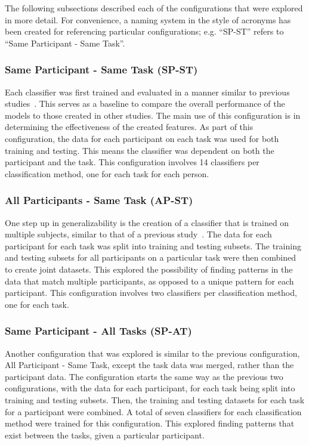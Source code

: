 \documentclass[11pt]{article}
\begin{document}
	The following subsections described each of the configurations that were explored in more detail. For convenience, a naming system in the style of acronyms has been created for referencing particular configurations; e.g. ``SP-ST'' refers to ``Same Participant - Same Task''.
		
		\subsubsection{Same Participant - Same Task (SP-ST)}
		Each classifier was first trained and evaluated in a manner similar to previous studies~\cite{...}. This serves as a baseline to compare the overall performance of the models to those created in other studies. The main use of this configuration is in determining the effectiveness of the created features. As part of this configuration, the data for each participant on each task was used for both training and testing. This means the classifier was dependent on both the participant and the task. This configuration involves 14 classifiers per classification method, one for each task for each person.
		 
		\subsubsection{All Participants - Same Task (AP-ST)}
		One step up in generalizability is the creation of a classifier that is trained on multiple subjects, similar to that of a previous study~\cite{}. The data for each participant for each task was split into training and testing subsets. The training and testing subsets for all participants on a particular task were then combined to create joint datasets. This explored the possibility of finding patterns in the data that match multiple participants, as opposed to a unique pattern for each participant. This configuration involves two classifiers per classification method, one for each task.
		
		\subsubsection{Same Participant - All Tasks (SP-AT)}
		Another configuration that was explored is similar to the previous configuration, All Participant - Same Task, except the task data was merged, rather than the participant data. The configuration starts the same way as the previous two configurations, with the data for each participant, for each task being split into training and testing subsets. Then, the training and testing datasets for each task for a participant were combined. A total of seven classifiers for each classification method were trained for this configuration. This explored finding patterns that exist between the tasks, given a particular participant.
		
\end{document}

